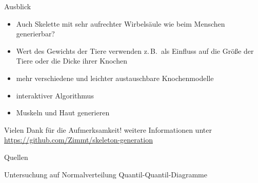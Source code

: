 \documentclass{beamer}
\newcommand{\zb}{z.\,B.\ }
\begin{document}
\addtocounter{framenumber}{2}

\begin{frame}{Ausblick}
 \begin{itemize}
  \item Auch Skelette mit sehr aufrechter Wirbelsäule wie beim Menschen generierbar?
  \item Wert des Gewichts der Tiere verwenden \zb als Einfluss auf die Größe der Tiere oder die Dicke ihrer Knochen
  \item mehr verschiedene und leichter austauschbare Knochenmodelle
  \item interaktiver Algorithmus
  \item Muskeln und Haut generieren
 \end{itemize}
\end{frame}


\begin{frame}[focus]
 Vielen Dank für die Aufmerksamkeit!
 \vfill
 \small weitere Informationen unter \url{https://github.com/Zimmt/skeleton-generation}
\end{frame}

\appendix
\begin{frame}[shrink=5]{Quellen}
 \printbibliography[heading=bibintoc]
\end{frame}

\begin{frame}{Untersuchung auf Normalverteilung}
 Quantil-Quantil-Diagramme
  \begin{figure}
  ~
  ~
 \end{figure}
\end{frame}
\end{document}
